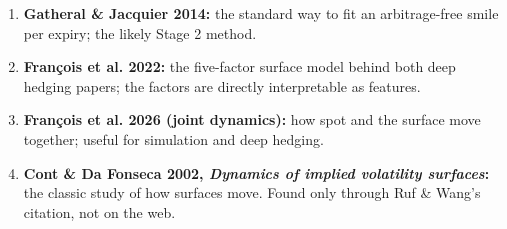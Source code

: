 \documentclass{article}
\begin{document}
\begin{enumerate}

\item \textbf{Gatheral \& Jacquier 2014:} the standard way to fit an arbitrage-free smile per expiry; the likely Stage 2 method.

\item \textbf{François et al. 2022:} the five-factor surface model behind both deep hedging papers; the factors are directly interpretable as features.

\item \textbf{François et al. 2026 (joint dynamics):} how spot and the surface move together; useful for simulation and deep hedging.

\item \textbf{Cont \& Da Fonseca 2002, \emph{Dynamics of implied volatility surfaces}:} the classic study of how surfaces move. Found only through Ruf \& Wang's citation, not on the web.

\end{enumerate}
\end{document}
